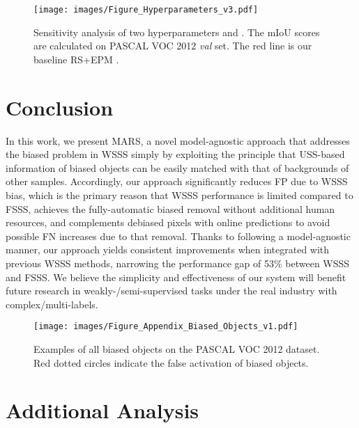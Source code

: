 \documentclass[10pt,twocolumn,letterpaper]{article}
\begin{document}
\begin{figure}
  \centering
  \texttt{[image: images/Figure\_Hyperparameters\_v3.pdf]}
\caption{
      Sensitivity analysis of two hyperparameters  and . The mIoU scores are calculated on PASCAL VOC 2012 \emph{val} set. The red line is our baseline RS+EPM \cite{jo2022recurseed}.
  }
  \label{fig:hyper}
\vspace{-0.4cm}
\end{figure}

\section{Conclusion}\label{sec:concl}







In this work, we present MARS, a novel model-agnostic approach that addresses the biased problem in WSSS simply by exploiting the principle that USS-based information of biased objects can be easily matched with that of backgrounds of other samples. Accordingly, our approach significantly reduces FP due to WSSS bias, which is the primary reason that WSSS performance is limited compared to FSSS, achieves the fully-automatic biased removal without additional human resources, and complements debiased pixels with online predictions to avoid possible FN increases due to that removal. Thanks to following a model-agnostic manner, our approach yields consistent improvements when integrated with previous WSSS methods, narrowing the performance gap of 53\% between WSSS and FSSS. We believe the simplicity and effectiveness of our system will benefit future research in weakly-/semi-supervised tasks under the real industry with complex/multi-labels. 

\clearpage

{\small


}

\clearpage
\appendix

\begin{figure*}
  \centering
  \texttt{[image: images/Figure\_Appendix\_Biased\_Objects\_v1.pdf]}
\caption{
      Examples of all biased objects on the PASCAL VOC 2012 dataset. Red dotted circles indicate the false activation of biased objects.
  }
  \label{fig:bias_examples}
\end{figure*}

\section{Additional Analysis}
\end{document}
